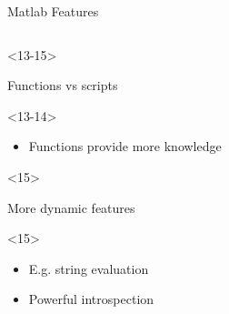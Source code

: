 \begin{frame}[fragile]{Matlab Features}
\begin{columns}
\begin{column}[T]{5cm}
\begin{itemize}
        \begin{onlyenv}<13-15>
        \item Functions vs scripts
          \begin{onlyenv}<13-14>
            \begin{itemize}
            \item Functions provide more knowledge
            \end{itemize}         
          \end{onlyenv}
        \end{onlyenv}

        \begin{onlyenv}<15>
        \item More dynamic features
          \begin{onlyenv}<15>
            \begin{itemize}
            \item E.g. string evaluation
            \item Powerful introspection
            \end{itemize}         
          \end{onlyenv}
        \end{onlyenv}


      \end{itemize}
    \end{column}
  \end{columns}



\end{frame}





